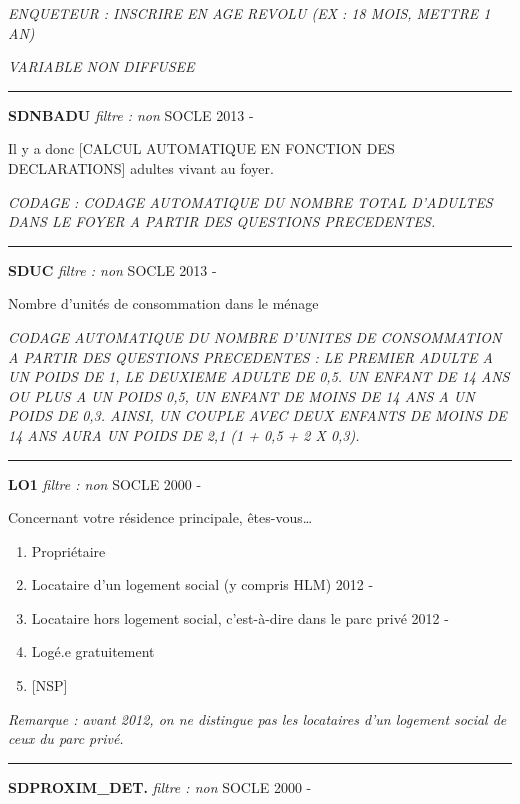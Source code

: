 \documentclass[12pt,a4paper]{reedthesis}
\providecommand{\tightlist}{%
  \setlength{\itemsep}{0pt}\setlength{\parskip}{0pt}}
\begin{document}
\emph{ENQUETEUR : INSCRIRE EN AGE REVOLU (EX : 18 MOIS, METTRE 1 AN)}

\emph{VARIABLE NON DIFFUSEE}
\begin{center}\rule{0.5\linewidth}{0.5pt}\end{center}

\textbf{SDNBADU} \emph{filtre : non} SOCLE 2013 -

Il y a donc {[}CALCUL AUTOMATIQUE EN FONCTION DES DECLARATIONS{]} adultes vivant au foyer.

\emph{CODAGE : CODAGE AUTOMATIQUE DU NOMBRE TOTAL D'ADULTES DANS LE FOYER A PARTIR DES QUESTIONS PRECEDENTES.}
\begin{center}\rule{0.5\linewidth}{0.5pt}\end{center}

\textbf{SDUC} \emph{filtre : non} SOCLE 2013 -

Nombre d'unités de consommation dans le ménage

\emph{CODAGE AUTOMATIQUE DU NOMBRE D'UNITES DE CONSOMMATION A PARTIR DES QUESTIONS PRECEDENTES : LE PREMIER ADULTE A UN POIDS DE 1, LE DEUXIEME ADULTE DE 0,5. UN ENFANT DE 14 ANS OU PLUS A UN POIDS 0,5, UN ENFANT DE MOINS DE 14 ANS A UN POIDS DE 0,3. AINSI, UN COUPLE AVEC DEUX ENFANTS DE MOINS DE 14 ANS AURA UN POIDS DE 2,1 (1 + 0,5 + 2 X 0,3).}
\begin{center}\rule{0.5\linewidth}{0.5pt}\end{center}

\textbf{LO1} \emph{filtre : non} SOCLE 2000 -

Concernant votre résidence principale, êtes-vous\ldots{}
\begin{enumerate}
\def\labelenumi{\arabic{enumi}.}
\tightlist
\item
  Propriétaire
\item
  Locataire d'un logement social (y compris HLM) 2012 -
\item
  Locataire hors logement social, c'est-à-dire dans le parc privé 2012 -
\item
  Logé.e gratuitement
\item
  {[}NSP{]}
\end{enumerate}
\emph{Remarque : avant 2012, on ne distingue pas les locataires d'un logement social de ceux du parc privé.}
\begin{center}\rule{0.5\linewidth}{0.5pt}\end{center}

\textbf{SDPROXIM\_DET.} \emph{filtre : non} SOCLE 2000 -
\end{document}
